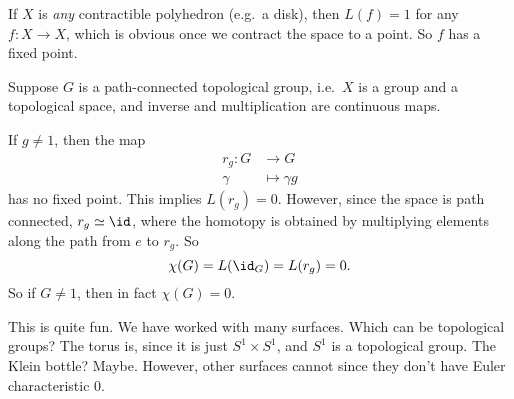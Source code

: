 \documentclass[a4paper]{article}
\begin{document}
\begin{eg}
  If $X$ is \emph{any} contractible polyhedron (e.g.\ a disk), then $L(f) = 1$ for any $f: X \to X$, which is obvious once we contract the space to a point. So $f$ has a fixed point.
\end{eg}

\begin{eg}
  Suppose $G$ is a path-connected topological group, i.e.\ $X$ is a group and a topological space, and inverse and multiplication are continuous maps.

  If $g \not= 1$, then the map
  \begin{align*}
    r_g: G &\to G\\
    \gamma &\mapsto \gamma g
  \end{align*}
  has no fixed point. This implies $L(r_g) = 0$. However, since the space is path connected, $r_g \simeq \id$, where the homotopy is obtained by multiplying elements along the path from $e$ to $r_g$. So
  \[
    \chi(G) = L(\id_G) = L(r_g) = 0.
  \]
  So if $G \not= 1$, then in fact $\chi(G) = 0$.
\end{eg}
This is quite fun. We have worked with many surfaces. Which can be topological groups? The torus is, since it is just $S^1 \times S^1$, and $S^1$ is a topological group. The Klein bottle? Maybe. However, other surfaces cannot since they don't have Euler characteristic $0$.
\end{document}
